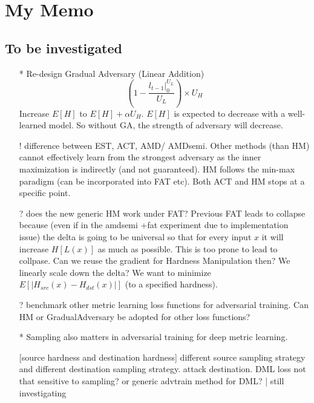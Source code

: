 \newpage
\appendix

\section{My Memo}

\subsection{To be investigated}

\begin{itemize}

	\item [*] Re-design Gradual Adversary (Linear Addition)
		\[
			(1-\frac{l_{t-1}|_0^{U_L}}{U_L}) \times U_H
		\]
		Increase $E[H]$ to $E[H]+\alpha U_H$. $E[H]$ is expected to decrease
		with a well-learned model. So without GA, the strength of adversary
		will decrease.

	\item [!] difference between EST, ACT, AMD/ AMDsemi.
		Other methods (than HM) cannot effectively learn from the strongest
		adversary as the inner maximization is indirectly (and not guaranteed).
		HM follows the min-max paradigm (can be incorporated into FAT etc).
		Both ACT and HM stops at a specific point.
	
	\item [?] does the new generic HM work under FAT?
		Previous FAT leads to collapse because (even if in the amdsemi +fat
		experiment due to implementation issue) the delta is going to be universal
		so that for every input $x$ it will increase $H[L(x)]$ as much as possible.
		This is too prone to lead to collpase. Can we reuse the gradient for 
		Hardness Manipulation then? We linearly scale down the delta?
		We want to minimize $E[|H_{src}(x)-H_{dst}(x)|]$ (to a specified hardness).

	\item [?] benchmark other metric learning loss functions for adversarial
		training. Can HM or GradualAdversary be adopted for other loss functions?

	\item [*] Sampling also matters in adversarial training for deep metric learning.

		[source hardness and destination hardness] different source sampling
		strategy and different destination sampling strategy. attack
		destination. DML loss not that sensitive to sampling? or generic
		advtrain method for DML? | still investigating


\end{itemize}

